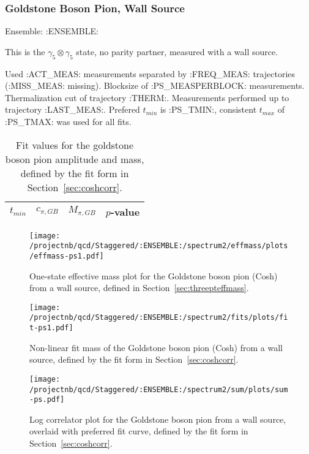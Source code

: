 
\subsubsection{Goldstone Boson Pion, Wall Source}

Ensemble: :ENSEMBLE:

This is the $\gamma_5 \otimes \gamma_5$ state, no parity partner, measured with a wall source.

{\small{Used :ACT_MEAS: measurements separated by :FREQ_MEAS: trajectories (:MISS_MEAS: missing). Blocksize of :PS_MEASPERBLOCK: measurements. Thermalization cut of trajectory :THERM:. Measurements performed up to trajectory :LAST_MEAS:. Prefered $t_{min}$ is :PS_TMIN:, consistent $t_{max}$ of :PS_TMAX: was used for all fits.}}

\begin{table}[ht!]
\centering
\scriptsize
\begin{tabular}{|c|c|c|c|}
\hline
 $t_{min}$ & $c_{\pi, GB}$ &  $M_{\pi, GB}$ & $p$-value \\
\hline

\end{tabular}
\caption{Fit values for the goldstone boson pion amplitude and mass, defined by the fit form in Section~\ref{sec:coshcorr}.}
\end{table}

\begin{multicols}{2}
\begin{figure}[H]
\centering
\texttt{[image: /projectnb/qcd/Staggered/:ENSEMBLE:/spectrum2/effmass/plots/effmass-ps1.pdf]}
\caption{One-state effective mass plot for the Goldstone boson pion (Cosh) from a wall source, defined in Section~\ref{sec:threepteffmass}.}
\end{figure}
\columnbreak
\begin{figure}[H]
\centering
\texttt{[image: /projectnb/qcd/Staggered/:ENSEMBLE:/spectrum2/fits/plots/fit-ps1.pdf]}
\caption{Non-linear fit mass of the Goldstone boson pion (Cosh) from a wall source, defined by the fit form in Section~\ref{sec:coshcorr}.}
\end{figure}
\end{multicols}

\begin{figure}[H]
\centering
\texttt{[image: /projectnb/qcd/Staggered/:ENSEMBLE:/spectrum2/sum/plots/sum-ps.pdf]}
\caption{Log correlator plot for the Goldstone boson pion from a wall source, overlaid with preferred fit curve, defined by the fit form in Section~\ref{sec:coshcorr}.}
\end{figure}

